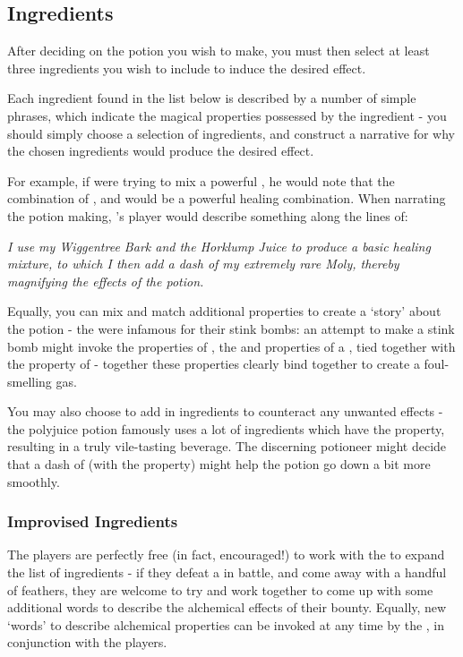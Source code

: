 \subsection{Ingredients}

After deciding on the potion you wish to make, you must then select at least three ingredients you wish to include to induce the desired effect. 

Each ingredient found in the list below is described by a number of simple phrases, which indicate the magical properties possessed by the ingredient - you should simply choose a selection of ingredients, and construct a narrative for why the chosen ingredients would produce the desired effect. 

For example, if  were trying to mix a powerful , he would note that the combination of ,  and  would be a powerful healing combination. When narrating the potion making, 's player would describe something along the lines of:

{\it I use my Wiggentree Bark and the Horklump Juice to produce a basic healing mixture, to which I then add a dash of my extremely rare Moly, thereby magnifying the effects of the potion.}

Equally, you can mix and match additional properties to create a `story' about the potion - the  were infamous for their stink bombs: an attempt to make a stink bomb might invoke the  properties of , the  and  properties of a , tied together with the  property of  - together these properties clearly bind together to create a foul-smelling gas. 

You may also choose to add in ingredients to counteract any unwanted effects - the polyjuice potion famously uses a lot of ingredients which have the  property, resulting in a truly vile-tasting beverage. The discerning potioneer might decide that a dash of  (with the  property) might help the potion go down a bit more smoothly. 



\subsubsection{Improvised Ingredients}

The players are perfectly free (in fact, encouraged!) to work with the  to expand the list of ingredients - if they defeat a  in battle, and come away with a handful of feathers, they are welcome to try and work together to come up with some additional words to describe the alchemical effects of their bounty. Equally, new `words' to describe alchemical properties can be invoked at any time by the , in conjunction with the players. 

